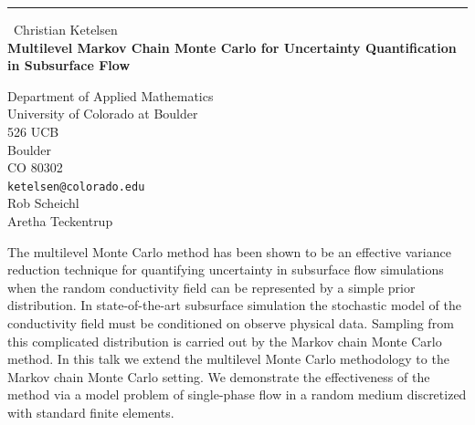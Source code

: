 \documentclass{report}
\begin{document}
\begin{center}
\rule{6in}{1pt} \
{\large Christian Ketelsen \\
{\bf Multilevel Markov Chain Monte Carlo for Uncertainty Quantification in Subsurface Flow}}

Department of Applied Mathematics \\ University of Colorado at Boulder \\ 526 UCB \\ Boulder \\ CO 80302
\\
{\tt ketelsen@colorado.edu}\\
Rob Scheichl \\
Aretha Teckentrup\end{center}

The multilevel Monte Carlo method has been shown to be an effective
variance reduction technique for quantifying uncertainty in subsurface
flow simulations when the random conductivity field can be represented by
a simple prior distribution. In state-of-the-art subsurface simulation
the stochastic model of the conductivity field must be conditioned on
observe physical data. Sampling from this complicated distribution is
carried out by the Markov chain Monte Carlo method. In this talk we
extend the multilevel Monte Carlo methodology to the Markov chain Monte
Carlo setting. We demonstrate the effectiveness of the method via a model
problem of single-phase flow in a random medium discretized with standard
finite elements.
\end{document}
